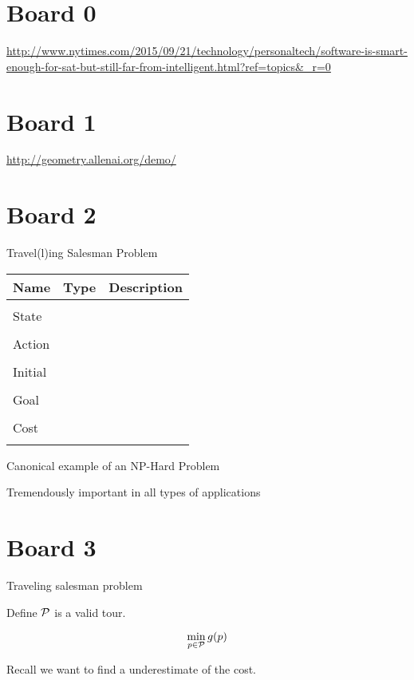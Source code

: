 \documentclass[10pt]{article}
\begin{document}
\MakeScribeTop{}

\section{Board 0}

\url{http://www.nytimes.com/2015/09/21/technology/personaltech/software-is-smart-enough-for-sat-but-still-far-from-intelligent.html?ref=topics&_r=0}

\section{Board 1}
\url{http://geometry.allenai.org/demo/}


\section{Board 2}

Travel(l)ing Salesman Problem


\begin{center}
\begin{tabularx}{\linewidth}{llX}
  \toprule
  Name  & Type & Description \\
  \midrule
\\
 State &  & \censor{}  \\\\
 Action &   & \censor{} \\\\
 Initial & & \censor{} \\\\
 Goal & & \censor{} \\\\
 Cost & & \\\\
 \bottomrule
\end{tabularx}
\end{center}

Canonical example of an NP-Hard Problem

Tremendously important in all types of applications

\section{Board 3}

Traveling salesman problem

Define ${\cal P}$ is a valid tour.

\[ \min_{p \in {\cal P}} g(p) \] 

Recall we want to find a underestimate of the cost.
\end{document}

